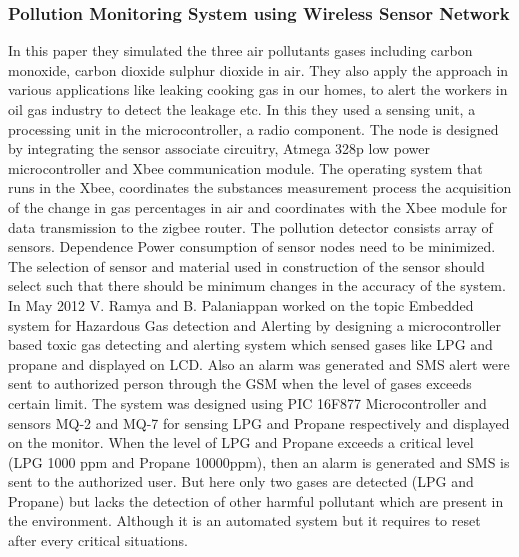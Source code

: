 \subsubsection{Pollution Monitoring System using Wireless Sensor Network \cite{15} }
In this paper they simulated the three air pollutants gases including carbon monoxide, carbon dioxide sulphur dioxide in air. They also apply the approach in various applications like leaking cooking gas in our homes, to alert the workers in oil gas industry to detect the leakage etc. In this they used a sensing unit, a processing unit in the microcontroller, a radio component. The node is designed by integrating the sensor associate circuitry, Atmega 328p low power microcontroller and Xbee communication module. The operating system that runs in the Xbee, coordinates the substances measurement process the acquisition of the change in gas percentages in air and coordinates with the Xbee module for data transmission to the zigbee router. The pollution detector consists array of sensors. 
 Dependence Power consumption of sensor nodes need to be minimized. The selection of sensor and material used in construction of the sensor should select such that there should be minimum changes in the accuracy of the system. In May 2012 V. Ramya and B. Palaniappan worked on the topic Embedded system for Hazardous Gas detection and Alerting by designing a microcontroller based toxic gas detecting and alerting system which sensed gases like LPG and propane and displayed on LCD. Also an alarm was generated and SMS alert were sent to authorized person through the GSM when the level of gases exceeds certain limit.
The system was designed using PIC 16F877 Microcontroller and sensors MQ-2 and MQ-7 for sensing LPG and Propane respectively and displayed on the monitor. When the level of LPG and Propane exceeds a critical level (LPG 1000 ppm and Propane 10000ppm), then an alarm is generated and SMS is sent to the authorized user. But here only two gases are detected (LPG and Propane) but lacks the detection of other harmful pollutant which are present in the environment. Although it is an automated system but it requires to reset after every critical situations.

